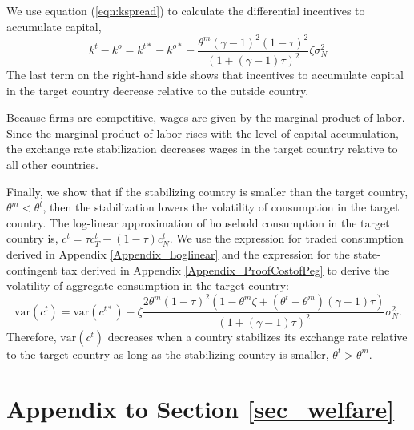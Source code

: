 We use equation (\ref{eqn:kspread}) to calculate the differential
incentives to accumulate capital,
\begin{equation*}
  k^t - k^o = k^{t \ast} - k^{o \ast} -
  \frac{\theta^m (\gamma - 1)^2 (1 - \tau)^2}{\left( 1 + (\gamma - 1) \tau \right)^2} \zeta \sigma_N^2
\end{equation*}
The last term on the right-hand side shows that incentives to
accumulate capital in the target country decrease relative to the
outside country.

Because firms are competitive, wages are given by the marginal product
of labor. Since the marginal product of labor rises with the level of
capital accumulation, the exchange rate stabilization decreases wages
in the target country relative to all other countries.

Finally, we show that if the stabilizing country is smaller than the
target country, $\theta^m < \theta^t$, then the stabilization lowers
the volatility of consumption in the target country. The log-linear
approximation of household consumption in the target country is,
$c^t = \tau c_T^t + (1 - \tau) c_N^t$. We use the expression for
traded consumption derived in Appendix \ref{Appendix_Loglinear} and
the expression for the state-contingent tax derived in Appendix
\ref{Appendix_ProofCostofPeg} to derive the volatility of aggregate
consumption in the target country:
\begin{equation*}
  \text{var} \left( c^t \right)
  = \text{var} \left( c^{t \ast} \right) 
  - \zeta \frac{2 \theta^m (1 - \tau)^2 \left( 1 - \theta^m \zeta + \left( \theta^t - \theta^m \right)(\gamma - 1) \tau \right)}{\left( 1 + (\gamma - 1) \tau \right)^2}\sigma_N^2.
\end{equation*}
Therefore, $\text{var} \left( c^t \right)$ decreases when a country
stabilizes its exchange rate relative to the target country as long as
the stabilizing country is smaller, $\theta^t > \theta^m$.

\section{Appendix to Section \ref{sec_welfare}
  \label{Appendix_Welfare}}

